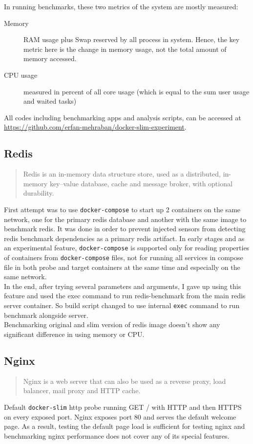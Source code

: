 \documentclass[10pt]{article}
\begin{document}
In running benchmarks, these two metrics of the system are mostly measured:
\begin{description}
    \item[Memory] RAM usage plus Swap reserved by all process in system. Hence, the key metric here is the change in memory usage, not the total amount of memory accessed.
    \item[CPU usage] measured in percent of all core usage (which is equal to the sum user usage and waited tasks)
\end{description}

All codes including benchmarking apps and analysis scripts, can be accessed at \url{https://github.com/erfan-mehraban/docker-slim-experiment}.

\subsection{Redis}
\begin{quote}
    Redis is an in-memory data structure store, used as a distributed, in-memory key–value database, cache and message broker, with optional durability.
\end{quote}
First attempt was to use {\tt docker-compose} to start up 2 containers on the same network, one for the primary redis database and another with the same image to benchmark redis. It was done in order to prevent injected sensors from detecting redis benchmark dependencies as a primary redis artifact. In early stages and as an experimental feature, {\tt docker-compose} is supported only for reading properties of containers from {\tt docker-compose} files, not for running all services in compose file in both probe and target containers at the same time and especially on the same network.\\
In the end, after trying several parameters and arguments, I gave up using this feature and used the exec command to run redis-benchmark from the main redis server container. So build script changed to use internal {\tt exec} command to run benchmark alongside server.\\
Benchmarking original and slim version of redis image doesn't show any significant difference in using memory or CPU.


\subsection{Nginx}
\begin{quote}
    Nginx is a web server that can also be used as a reverse proxy, load balancer, mail proxy and HTTP cache.
\end{quote}
Default {\tt docker-slim} http probe running GET / with HTTP and then HTTPS on every exposed port. Nginx exposes port 80 and serves the default welcome page. As a result, testing the default page load is sufficient for testing nginx and benchmarking nginx performance does not cover any of its special features.
\end{document}
